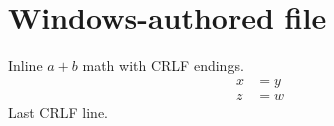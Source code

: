 \section{Windows-authored file}
Inline $a+b$ math with CRLF endings.
\begin{align}
  x &= y \\
  z &= w
\end{align}
Last CRLF line.

